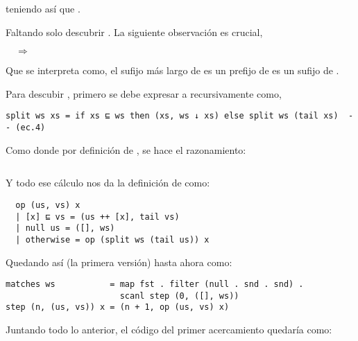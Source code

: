 teniendo así que .

Faltando solo descubrir . La siguiente observación es crucial,

 $\quad\Longrightarrow\quad$ 

Que se interpreta como, el sufijo más largo de  es un prefijo de  es un
sufijo de .

Para descubir , primero se debe expresar a  recursivamente como,
\begin{verbatim}
split ws xs = if xs ⊑ ws then (xs, ws ↓ xs) else split ws (tail xs)  -- (ec.4)
\end{verbatim}

Como  donde por definición de ,
se hace el razonamiento:

\inputminted{haskell}{definiciones/kmp/1-op-raz-eq.hs}

Y todo ese cálculo nos da la definición de  como:

\begin{verbatim}
  op (us, vs) x
  | [x] ⊑ vs = (us ++ [x], tail vs)
  | null us = ([], ws)
  | otherwise = op (split ws (tail us)) x
\end{verbatim}

Quedando así (la primera versión) hasta ahora como:

\begin{verbatim}
matches ws           = map fst . filter (null . snd . snd) .
                       scanl step (0, ([], ws))
step (n, (us, vs)) x = (n + 1, op (us, vs) x)
\end{verbatim}



Juntando todo lo anterior, el código del primer acercamiento quedaría como:

\inputminted{haskell}{codigo/haskell/NaiveMatching.hs}


